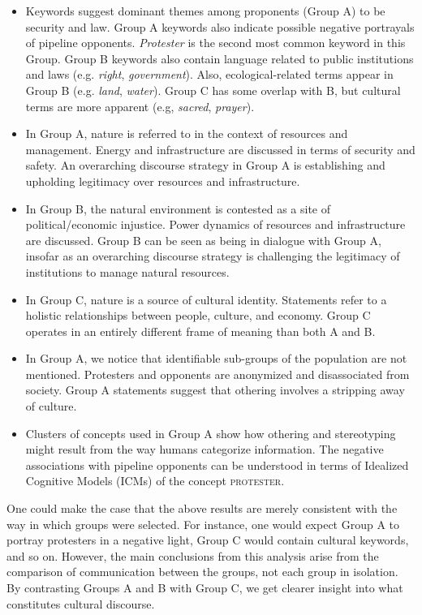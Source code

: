 \begin{itemize}
  \item Keywords suggest dominant themes among proponents (Group A) to be security and law. Group A keywords also indicate possible negative portrayals of pipeline opponents. \textit{Protester} is the second most common keyword in this Group. Group B keywords also contain language related to public institutions and laws (e.g. \textit{right}, \textit{government}). Also, ecological-related terms appear in Group B (e.g. \textit{land}, \textit{water}). Group C has some overlap with B, but cultural terms are more apparent (e.g, \textit{sacred}, \textit{prayer}).
  
 \item In Group A, nature is referred to in the context of resources and management. Energy and infrastructure are discussed in terms of security and safety. An overarching discourse strategy in Group A is establishing and upholding legitimacy over resources and infrastructure. 
 
  \item In Group B, the natural environment is contested as a site of political/economic injustice. Power dynamics of resources and infrastructure are discussed. Group B can be seen as being in dialogue with Group A, insofar as an overarching discourse strategy is challenging the legitimacy of institutions to manage natural resources.
  
  \item In Group C, nature is a source of cultural identity. Statements refer to a holistic relationships between people, culture, and economy. Group C operates in an entirely different frame of meaning than both A and B. 
  
  \item In Group A, we notice that identifiable sub-groups of the population are not mentioned. Protesters and opponents are anonymized and disassociated from society. Group A statements suggest that othering involves a stripping away of culture.
  
  \item Clusters of concepts used in Group A show how othering and stereotyping might result from the way humans categorize information. The negative associations with pipeline opponents can be understood in terms of Idealized Cognitive Models (ICMs) of the concept \textsc{protester}.

\end{itemize}

One could make the case that the above results are merely consistent with the way in which groups were selected. For instance, one would expect Group A to portray protesters in a negative light, Group C would contain cultural keywords, and so on. However, the main conclusions from this analysis arise from the comparison of communication between the groups, not each group in isolation. By contrasting Groups A and B with Group C, we get clearer insight into what constitutes cultural discourse. 

